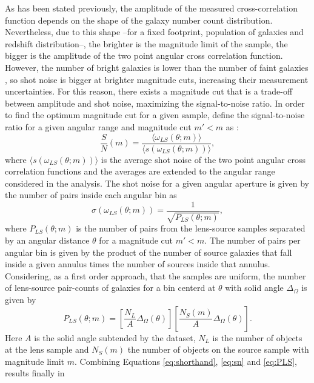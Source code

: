As has been stated previously, the amplitude of the measured cross-correlation function depends on the shape of the galaxy number count distribution. Nevertheless, due to this shape --for a fixed footprint, population of galaxies and redshift distribution--, the brighter is the magnitude limit of the sample, the bigger is the amplitude of the two point angular cross correlation function. However, the number of bright galaxies is lower than the number of faint galaxies \cite{1976ApJ...203..297S}, so shot noise is bigger at brighter magnitude cuts, increasing their measurement uncertainties. For this reason, there exists a magnitude cut that is a trade-off between amplitude and shot noise, maximizing the signal-to-noise ratio.  In  order to find the optimum magnitude cut for a given sample, define the signal-to-noise ratio for a given angular range  and magnitude cut $m'<m$ as \cite{1998MNRAS.294L..18M}:
\begin{equation}
\frac{S}{N}(m) = \frac{\langle \omega_{LS}(\theta;m)\rangle}{\langle s(\omega_{LS}(\theta;m))\rangle},
\label{eq:sn}
\end{equation}
where $\langle s(\omega_{LS}(\theta;m))\rangle$ is the average shot noise of the two point angular cross correlation functions and the averages are extended to the angular range considered in the analysis. The shot noise for a given angular aperture is given by the number of pairs inside each angular bin as
\begin{equation}
\sigma(\omega_{LS}(\theta;m)) = \frac{1}{\sqrt{P_{LS}(\theta;m)}},
\end{equation}
where $P_{LS}(\theta;m)$ is the number of pairs from the lens-source samples separated by an angular distance $\theta$ for a magnitude cut $m '<m$. The number of pairs per angular bin is given by the product of the number of source galaxies that fall inside a given annulus times the number of sources inside that annulus. Considering, as a first order approach, that the samples are uniform, the number of lens-source pair-counts of galaxies for a bin centerd at $\theta$ with solid angle $\Delta_\Omega$ is given by
\begin{equation}
P_{LS}(\theta;m) = \left[\frac{N_L}{A}\Delta_\Omega(\theta)\right]\left[\frac{N_S(m)}{A}\Delta_\Omega(\theta)\right].
\label{eq:PLS}
\end{equation}
Here $A$ is the solid angle subtended by the dataset, $N_L$ is the number of objects at the lens sample and $N_S(m)$ the number of objects on the source sample with magnitude limit $m$. Combining Equations \ref{eq:shorthand}, \ref{eq:sn} and \ref{eq:PLS}, results finally in
